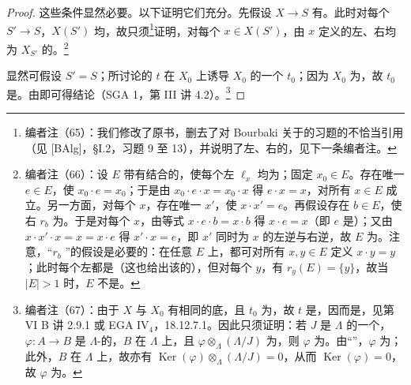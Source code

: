 \begin{proof}
这些条件显然必要。以下证明它们充分。先假设 $X\to S$ 有。此时对每个 $S'\to S$，$X(S')$ 均，故只须\footnote{编者注（65）：我们修改了原书，删去了对 Bourbaki 关于的习题的不恰当引用（见 [BAlg]，\S I.2，习题 9 至 13），并说明了左、右的，见下一条编者注。}证明，对每个 $x\in X(S')$，由 $x$ 定义的左、右均为 $X_{S'}$ 的。\footnote{编者注（66）：设 $E$ 带有结合的，使每个左 $\ell_x$ 均为；固定 $x_0\in E$。存在唯一 $e\in E$，使 $x_0\cdot e=x_0$；于是由 $x_0\cdot e\cdot x=x_0\cdot x$ 得 $e\cdot x=x$，对所有 $x\in E$ 成立。另一方面，对每个 $x$，存在唯一 $x'$，使 $x\cdot x'=e$。再假设存在 $b\in E$，使右 $r_b$ 为。于是对每个 $x$，由等式 $x\cdot e\cdot b=x\cdot b$ 得 $x\cdot e=x$（即 $e$ 是）；又由 $x\cdot x'\cdot x=x=x\cdot e$ 得 $x'\cdot x=e$，即 $x'$ 同时为 $x$ 的左逆与右逆，故 $E$ 为。注意，“$r_b$ ”的假设是必要的：在任意 $E$ 上，都可对所有 $x,y\in E$ 定义 $x\cdot y=y$；此时每个左都是（这也给出该的），但对每个 $y$，有 $r_y(E)=\{y\}$，故当 $|E|>1$ 时，$E$ 不是。}

显然可假设 $S'=S$；所讨论的 $t$ 在 $X_0$ 上诱导 $X_0$ 的一个 $t_0$；因为 $X_0$ 为，故 $t_0$ 是。由即可得结论（SGA 1，第 III 讲 4.2）。\footnote{编者注（67）：由于 $X$ 与 $X_0$ 有相同的底，且 $t_0$ 为，故 $t$ 是，因而是，见第 VI B 讲 2.9.1 或 EGA IV$_4$，18.12.7.1。因此只须证明：若 $J$ 是 $\Lambda$ 的一个，$\varphi:A\to B$ 是 $\Lambda$-的，$B$ 在 $\Lambda$ 上，且 $\varphi\otimes_\Lambda(\Lambda/J)$ 为，则 $\varphi$ 为。由“”，$\varphi$ 为；此外，$B$ 在 $\Lambda$ 上，故亦有 $\operatorname{Ker}(\varphi)\otimes_\Lambda(\Lambda/J)=0$，从而 $\operatorname{Ker}(\varphi)=0$，故 $\varphi$ 为。}


\end{proof}
